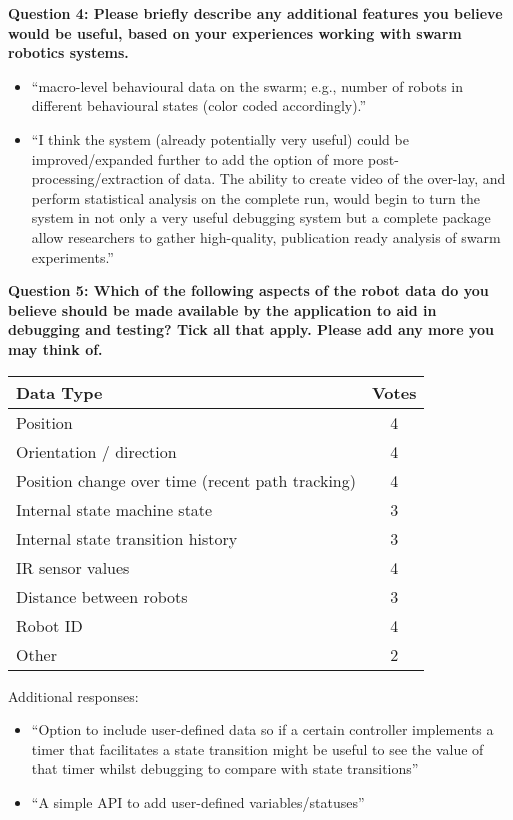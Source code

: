 \vspace{1cm}

\noindent\textbf{Question 4: Please briefly describe any additional features you believe would be useful, based on your experiences working with swarm robotics systems.}

\begin{itemize}
\item ``macro-level behavioural data on the swarm; e.g., number of robots in different behavioural states (color coded accordingly).''
\item ``I think the system (already potentially very useful) could be improved/expanded further to add the option of more post-processing/extraction of data. The ability to create video of the over-lay, and perform statistical analysis on the complete run, would begin to turn the system in not only a very useful debugging system but a complete package allow researchers to gather high-quality, publication ready analysis of swarm experiments.''
\end{itemize}

\noindent\textbf{Question 5: Which of the following aspects of the robot data do you believe should be made available by the application to aid in debugging and testing? Tick all that apply. Please add any more you may think of.}

\begin{center}
\begin{tabular}{ p{10cm} c }
 Data Type & Votes\\ 
 \hline
 Position & 4\\
 Orientation / direction & 4\\
 Position change over time (recent path tracking) & 4\\
 Internal state machine state & 3\\
 Internal state transition history & 3\\
 IR sensor values & 4\\
 Distance between robots & 3\\
 Robot ID & 4\\
 Other & 2\\
\end{tabular}
\end{center}

Additional responses:

\begin{itemize}
\item ``Option to include user-defined data so if a certain controller implements a timer that facilitates a state transition might be useful to see the value of that timer whilst debugging to compare with state transitions''
\item ``A simple API to add user-defined variables/statuses''
\end{itemize}

